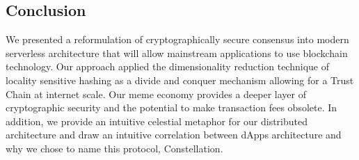 \documentclass{article}
\begin{document}
\subsection{Conclusion}
We presented a reformulation of cryptographically secure consensus into modern serverless architecture that will allow mainstream applications to use blockchain technology. Our approach applied the dimensionality reduction technique of locality sensitive hashing as a divide and conquer mechanism allowing for a Trust Chain at internet scale. Our meme economy provides a deeper layer of cryptographic security and the potential to make transaction fees obsolete. In addition, we provide an intuitive celestial metaphor for our distributed architecture and draw an intuitive correlation between dApps architecture and why we chose to name this protocol, Constellation.


\end{document}
